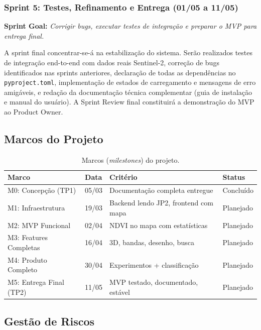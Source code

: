 \documentclass[12pt, a4paper]{article}
\begin{document}
\subsubsection{Sprint 5: Testes, Refinamento e Entrega (01/05 a 11/05)}

\textbf{Sprint Goal:} \textit{Corrigir bugs, executar testes de integração e preparar o MVP para entrega final.}

A sprint final concentrar-se-á na estabilização do sistema. Serão realizados testes de integração end-to-end com dados reais Sentinel-2, correção de bugs identificados nas sprints anteriores, declaração de todas as dependências no \texttt{pyproject.toml}, implementação de estados de carregamento e mensagens de erro amigáveis, e redação da documentação técnica complementar (guia de instalação e manual do usuário). A Sprint Review final constituirá a demonstração do MVP ao Product Owner.

\subsection{Marcos do Projeto}

\begin{table}[H]
\centering
\caption{Marcos (\textit{milestones}) do projeto.}
\label{tab:milestones}
\footnotesize
\begin{tabular}{llll}
\toprule
\textbf{Marco} & \textbf{Data} & \textbf{Critério} & \textbf{Status} \\
\midrule
M0: Concepção (TP1) & 05/03 & Documentação completa entregue & Concluído \\
M1: Infraestrutura & 19/03 & Backend lendo JP2, frontend com mapa & Planejado \\
M2: MVP Funcional & 02/04 & NDVI no mapa com estatísticas & Planejado \\
M3: Features Completas & 16/04 & 3D, bandas, desenho, busca & Planejado \\
M4: Produto Completo & 30/04 & Experimentos + classificação & Planejado \\
M5: Entrega Final (TP2) & 11/05 & MVP testado, documentado, estável & Planejado \\
\bottomrule
\end{tabular}
\end{table}

\subsection{Gestão de Riscos}
\end{document}
